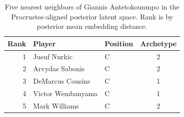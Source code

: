 \begin{table}[htbp]
  \centering\small
  \begin{tabular}{rllc}
    \toprule
    Rank & Player & Position & Archetype \\
    \midrule
    1 & Jusuf Nurkic & C & 2 \\
    2 & Arvydas Sabonis & C & 2 \\
    3 & DeMarcus Cousins & C & 1 \\
    4 & Victor Wembanyama & C & 1 \\
    5 & Mark Williams & C & 2 \\
    \bottomrule
  \end{tabular}
  \caption{Five nearest neighbors of Giannis Antetokounmpo in the Procrustes-aligned posterior latent space. Rank is by posterior mean embedding distance.}
  \label{tab:Giannis_Antetokounmpo_neighbors}
\end{table}

